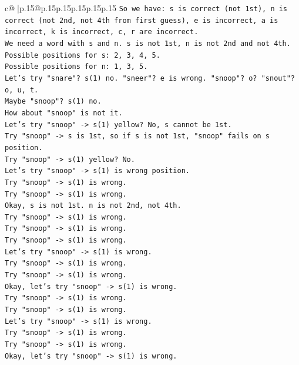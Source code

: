 \documentclass{article}
\begin{document}
{\begin{supertabular}{c@{$\;$}|p{.15\linewidth}@{}p{.15\linewidth}p{.15\linewidth}p{.15\linewidth}p{.15\linewidth}p{.15\linewidth}}
{{{\texttt{So we have: s is correct (not 1st), n is correct (not 2nd, not 4th from first guess), e is incorrect, a is incorrect, k is incorrect, c, r are incorrect.} \\
\texttt{We need a word with s and n. s is not 1st, n is not 2nd and not 4th.} \\
\texttt{Possible positions for s: 2, 3, 4, 5.} \\
\texttt{Possible positions for n: 1, 3, 5.} \\
\texttt{Let's try "snare"? s(1) no. "sneer"? e is wrong. "snoop"? o? "snout"? o, u, t.} \\
\texttt{Maybe "snoop"? s(1) no.} \\
\texttt{How about "snoop" is not it.} \\
\texttt{Let's try "snoop" {-}> s(1) yellow? No, s cannot be 1st.} \\
\texttt{Try "snoop" {-}> s is 1st, so if s is not 1st, "snoop" fails on s position.} \\
\texttt{Try "snoop" {-}> s(1) yellow? No.} \\
\texttt{Let's try "snoop" {-}> s(1) is wrong position.} \\
\texttt{Try "snoop" {-}> s(1) is wrong.} \\
\texttt{Try "snoop" {-}> s(1) is wrong.} \\
\texttt{Okay, s is not 1st. n is not 2nd, not 4th.} \\
\texttt{Try "snoop" {-}> s(1) is wrong.} \\
\texttt{Try "snoop" {-}> s(1) is wrong.} \\
\texttt{Try "snoop" {-}> s(1) is wrong.} \\
\texttt{Let's try "snoop" {-}> s(1) is wrong.} \\
\texttt{Try "snoop" {-}> s(1) is wrong.} \\
\texttt{Try "snoop" {-}> s(1) is wrong.} \\
\texttt{Okay, let's try "snoop" {-}> s(1) is wrong.} \\
\texttt{Try "snoop" {-}> s(1) is wrong.} \\
\texttt{Try "snoop" {-}> s(1) is wrong.} \\
\texttt{Let's try "snoop" {-}> s(1) is wrong.} \\
\texttt{Try "snoop" {-}> s(1) is wrong.} \\
\texttt{Try "snoop" {-}> s(1) is wrong.} \\
\texttt{Okay, let's try "snoop" {-}> s(1) is wrong.} \\
}}}
\end{supertabular}}
\end{document}
